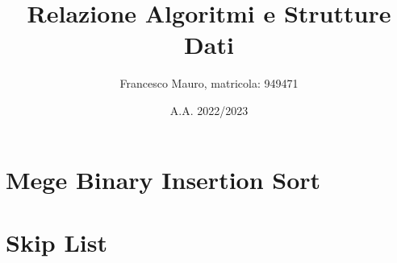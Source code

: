 \documentclass[letterpaper]{report}
\title{Relazione Algoritmi e Strutture Dati}
\author{Francesco Mauro, matricola: 949471}
\date{A.A. 2022/2023}
\begin{document}
\maketitle
\tableofcontents
\newpage
\chapter{Mege Binary Insertion Sort}

\chapter{Skip List}

\end{document}

